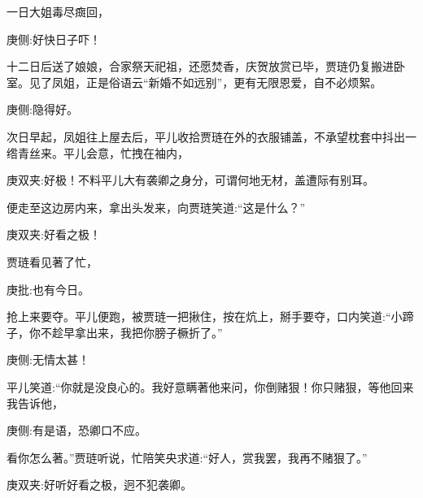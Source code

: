 \begin{parag}
\end{parag}


\begin{parag}
    一日大姐毒尽癍回，\begin{note}庚侧:好快日子吓！\end{note}十二日后送了娘娘，合家祭天祀祖，还愿焚香，庆贺放赏已毕，贾琏仍复搬进卧室。见了凤姐，正是俗语云“新婚不如远别”，更有无限恩爱，自不必烦絮。\begin{note}庚侧:隐得好。\end{note}
\end{parag}


\begin{parag}
    次日早起，凤姐往上屋去后，平儿收拾贾琏在外的衣服铺盖，不承望枕套中抖出一绺青丝来。平儿会意，忙拽在袖内，\begin{note}庚双夹:好极！不料平儿大有袭卿之身分，可谓何地无材，盖遭际有别耳。\end{note}便走至这边房内来，拿出头发来，向贾琏笑道:“这是什么？”\begin{note}庚双夹:好看之极！\end{note}贾琏看见著了忙，\begin{note}庚批:也有今日。\end{note}抢上来要夺。平儿便跑，被贾琏一把揪住，按在炕上，掰手要夺，口内笑道:“小蹄子，你不趁早拿出来，我把你膀子橛折了。”\begin{note}庚侧:无情太甚！\end{note}平儿笑道:“你就是没良心的。我好意瞒著他来问，你倒赌狠！你只赌狠，等他回来我告诉他，\begin{note}庚侧:有是语，恐卿口不应。\end{note}看你怎么著。”贾琏听说，忙陪笑央求道:“好人，赏我罢，我再不赌狠了。”\begin{note}庚双夹:好听好看之极，迥不犯袭卿。\end{note}
\end{parag}


